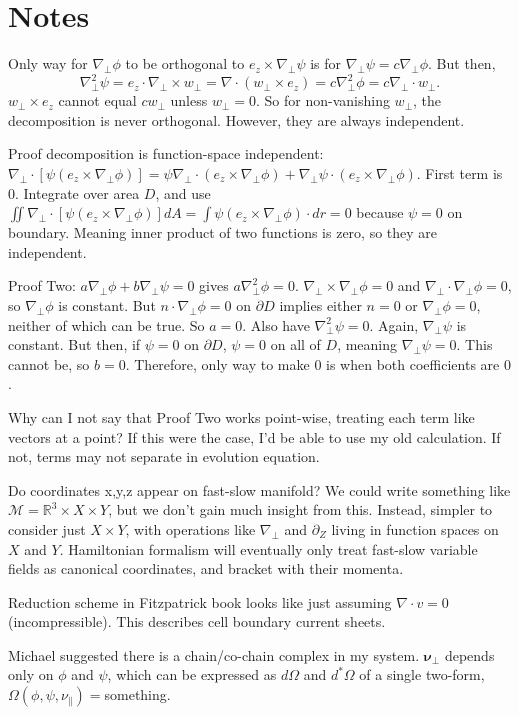 \documentclass{article}
\newcommand{\para}{\parallel}
\newcommand{\np}{\nabla_\perp}
\newcommand{\p}{\partial}
\newcommand{\pth} [1] {\left( #1 \right) }
\begin{document}
\section*{Notes}
Only way for $\np \phi$ to be orthogonal to $e_z\times\np\psi$ is for $\np\psi = c\np \phi$. But then, 
$$\np^2 \psi = e_z\cdot \np \times w_\perp = \nabla \cdot(w_\perp\times e_z) = c\np^2 \phi = c\np \cdot w_\perp.$$
$w_\perp\times e_z$ cannot equal $cw_\perp$ unless $w_\perp = 0$. So for non-vanishing $w_\perp$, the decomposition is never orthogonal. However, they are always independent. 

Proof decomposition is function-space independent: $\np\cdot [\psi(e_z\times \np\phi)] = \psi\np\cdot(e_z\times\np\phi) + \np\psi \cdot (e_z\times\np\phi)$. First term is 0. Integrate over area $D$, and use $\iint \np \cdot [\psi(e_z\times\np\phi)] dA = \int \psi(e_z \times \np\phi) \cdot dr = 0$ because $\psi=0$ on boundary. Meaning inner product of two functions is zero, so they are independent. 

Proof Two: $a\np\phi + b\np\psi=0$ gives $a\np^2\phi=0$. $\np\times\np\phi = 0$ and $\np \cdot \np\phi=0$, so $\np\phi$ is constant. But $n\cdot\np\phi=0$ on $\p D$ implies either $n=0$ or $\np\phi=0$, neither of which can be true. So $a=0$. Also have $\np^2\psi=0$. Again, $\np\psi$ is constant. But then, if $\psi=0$ on $\p D$, $\psi=0$ on all of $D$, meaning $\np\psi=0$. This cannot be, so $b=0$. Therefore, only way to make $0$ is when both coefficients are $0$. 

Why can I not say that Proof Two works point-wise, treating each term like vectors at a point? If this were the case, I'd be able to use my old calculation. If not, terms may not separate in evolution equation. 

Do coordinates x,y,z appear on fast-slow manifold? We could write something like $\mathcal{M} = \mathbb{R}^3\times X \times Y$, but we don't gain much insight from this. Instead, simpler to consider just $X\times Y$, with operations like $\np$ and $\p_Z$ living in function spaces on $X$ and $Y$. Hamiltonian formalism will eventually only treat fast-slow variable fields as canonical coordinates, and bracket with their momenta. 

Reduction scheme in Fitzpatrick book looks like just assuming $\nabla\cdot v =0$ (incompressible). This describes cell boundary current sheets. 

Michael suggested there is a chain/co-chain complex in my system. $\bm{\nu}_\perp$ depends only on $\phi$ and $\psi$, which can be expressed as $d\Omega$ and $d^*\Omega$ of a single two-form, $\Omega\pth{\phi,\psi,\nu_\para} = $something. 
\end{document}
